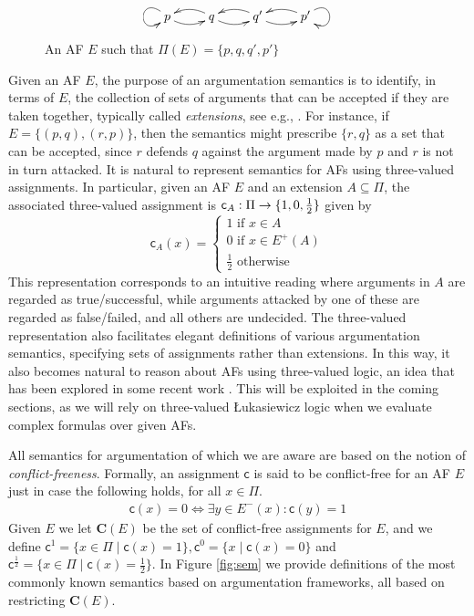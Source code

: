 \documentclass[greybox]{svmult}
\newcommand{\outa}[2]{#1^+(#2)}
\newcommand{\proto}{\mathbf C}
\newcommand{\clab}{\mathsf c}
\begin{document}
\begin{figure}
$$
\xymatrix{p \ar@(lu,ld) \ar@/_/[r] & q \ar@/_/[l] \ar@/_/[r] & q' \ar@/_/[l] \ar@/_/[r] & p' \ar@(ru,rd) \ar@/_/[l] }
$$
\caption{An AF $E$ such that $\Pi(E) = \{p,q,q',p'\}$}
\label{fig:1}
\end{figure}

Given an AF $E$, the purpose of an argumentation semantics is to identify, in terms of $E$, the 
collection of sets of arguments that can be accepted if they are taken together, typically called \emph{extensions}, see e.g., \cite{wu}. For instance, if $E = \{(p,q),(r,p)\}$, then the semantics might prescribe $\{r,q\}$ as a set that can be accepted, since $r$ defends $q$ against the argument made by $p$ and $r$ is not in turn attacked. It is natural to represent semantics for AFs using three-valued assignments. In particular, given an AF $E$ and an extension $A \subseteq \Pi$, the associated three-valued assignment is $\clab_A:\Pi \to \three$ given by
$$
\clab_A(x) = \begin{cases} 1 \text{ if } x \in A \\ 0 \text{ if } x \in \outa E A \\ \frac{1}{2} \text{ otherwise } \end{cases}
$$
This representation corresponds to an intuitive reading where arguments in $A$ are regarded as true/successful, while arguments attacked by one of these are regarded as false/failed, and all others are undecided. The three-valued representation also facilitates elegant definitions of various argumentation semantics, specifying sets of assignments rather than extensions. In this way, it also becomes natural to reason about AFs using three-valued logic, an idea that has been explored in some recent work \cite{dyrkolbotn,arieli,dyrkolbotn1}. This will be exploited in the coming sections, as we will rely on three-valued {\L}ukasiewicz logic when we evaluate complex formulas over given AFs.

All semantics for argumentation of which we are aware are based on the notion of \emph{conflict-freeness}. Formally, an assignment $\clab$ is said to be conflict-free for an AF $E$ just in case the following holds, for all $x \in \Pi$.
\begin{equation}\label{eq:cam}
\begin{array}{l}
\clab(x) = 0 \iff \exists y \in E^-(x): \clab(y) = 1
\end{array}
\end{equation}
Given $E$ we let $\proto(E)$ be the set of conflict-free assignments for $E$, and we define $\clab^1 = \{x \in \Pi \mid \clab(x) = 1\}, \clab^0 = \{x \mid \clab(x) = 0\}$ and $\clab^{\frac{1}{2}} = \{x \in \Pi \mid \clab(x) = \frac{1}{2}\}$. In Figure \ref{fig:sem} we provide definitions of the most commonly known semantics based on argumentation frameworks, all based on restricting $\proto(E)$. 
\end{document}
